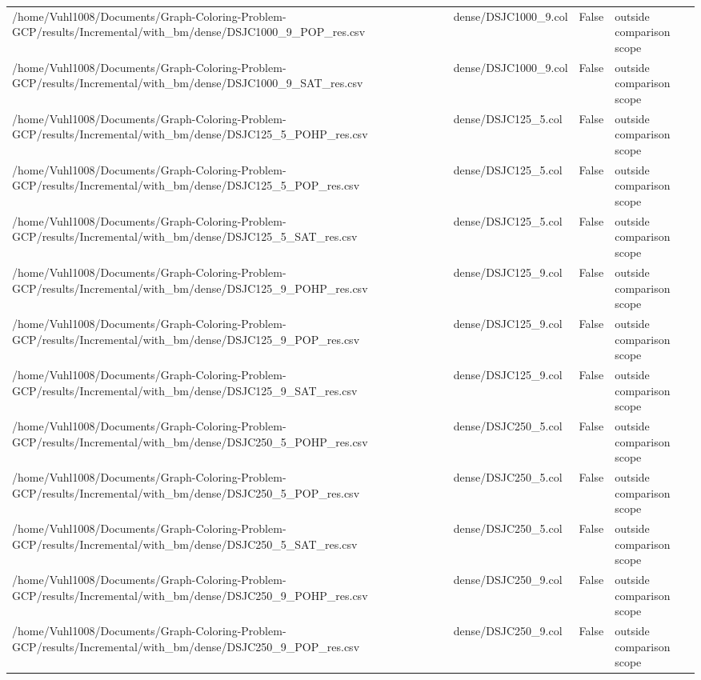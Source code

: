 \begin{table}[htbp]
\begin{tabular}{llll}
/home/Vuhl1008/Documents/Graph-Coloring-Problem-GCP/results/Incremental/with\_bm/dense/DSJC1000\_9\_POP\_res.csv & dense/DSJC1000\_9.col & False & outside comparison scope \\
/home/Vuhl1008/Documents/Graph-Coloring-Problem-GCP/results/Incremental/with\_bm/dense/DSJC1000\_9\_SAT\_res.csv & dense/DSJC1000\_9.col & False & outside comparison scope \\
/home/Vuhl1008/Documents/Graph-Coloring-Problem-GCP/results/Incremental/with\_bm/dense/DSJC125\_5\_POHP\_res.csv & dense/DSJC125\_5.col & False & outside comparison scope \\
/home/Vuhl1008/Documents/Graph-Coloring-Problem-GCP/results/Incremental/with\_bm/dense/DSJC125\_5\_POP\_res.csv & dense/DSJC125\_5.col & False & outside comparison scope \\
/home/Vuhl1008/Documents/Graph-Coloring-Problem-GCP/results/Incremental/with\_bm/dense/DSJC125\_5\_SAT\_res.csv & dense/DSJC125\_5.col & False & outside comparison scope \\
/home/Vuhl1008/Documents/Graph-Coloring-Problem-GCP/results/Incremental/with\_bm/dense/DSJC125\_9\_POHP\_res.csv & dense/DSJC125\_9.col & False & outside comparison scope \\
/home/Vuhl1008/Documents/Graph-Coloring-Problem-GCP/results/Incremental/with\_bm/dense/DSJC125\_9\_POP\_res.csv & dense/DSJC125\_9.col & False & outside comparison scope \\
/home/Vuhl1008/Documents/Graph-Coloring-Problem-GCP/results/Incremental/with\_bm/dense/DSJC125\_9\_SAT\_res.csv & dense/DSJC125\_9.col & False & outside comparison scope \\
/home/Vuhl1008/Documents/Graph-Coloring-Problem-GCP/results/Incremental/with\_bm/dense/DSJC250\_5\_POHP\_res.csv & dense/DSJC250\_5.col & False & outside comparison scope \\
/home/Vuhl1008/Documents/Graph-Coloring-Problem-GCP/results/Incremental/with\_bm/dense/DSJC250\_5\_POP\_res.csv & dense/DSJC250\_5.col & False & outside comparison scope \\
/home/Vuhl1008/Documents/Graph-Coloring-Problem-GCP/results/Incremental/with\_bm/dense/DSJC250\_5\_SAT\_res.csv & dense/DSJC250\_5.col & False & outside comparison scope \\
/home/Vuhl1008/Documents/Graph-Coloring-Problem-GCP/results/Incremental/with\_bm/dense/DSJC250\_9\_POHP\_res.csv & dense/DSJC250\_9.col & False & outside comparison scope \\
/home/Vuhl1008/Documents/Graph-Coloring-Problem-GCP/results/Incremental/with\_bm/dense/DSJC250\_9\_POP\_res.csv & dense/DSJC250\_9.col & False & outside comparison scope \\

\end{tabular}
\end{table}
